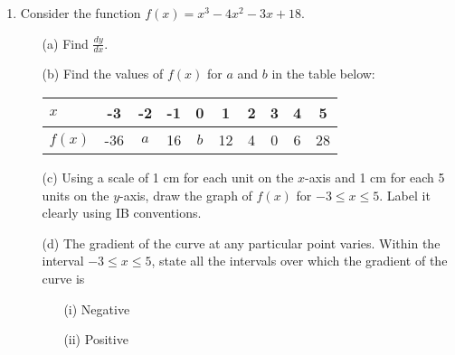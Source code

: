 \documentclass{article}
\begin{document}
\begin{enumerate}
\item Consider the function $f(x) = x^3 - 4x^2 - 3x + 18$.
\begin{itemize}
    \item[(a)] Find $\displaystyle \frac {dy}{dx}$.
	\item[(b)] Find the values of $f(x)$ for $a$ and $b$ in the table below:\\
	\begin{tabular}{|l|c|c|c|c|c|c|c|c|c|}
	\hline
	$x$ & -3 & -2 & -1 & 0 & 1 & 2 & 3 & 4 & 5\\
	\hline
    $f(x)$ & -36 & $a$ & 16 & $b$ & 12 & 4 & 0 & 6 & 28\\
	\hline
	\end{tabular}
	\item[(c)] Using a scale of 1 cm for each unit on the $x$-axis and 1 cm for each 5 units on the $y$-axis, draw the graph of $f(x)$ for $-3 \leq x \leq 5$. Label it clearly using IB conventions.
	\item[(d)] The gradient of the curve at any particular point varies. Within the interval $-3 \leq x \leq 5$, state all the intervals over which the gradient of the curve is
    \begin{itemize}
    \item[(i)] Negative
    \item[(ii)] Positive
    \end{itemize}

\end{itemize}

\end{enumerate}
\end{document}
